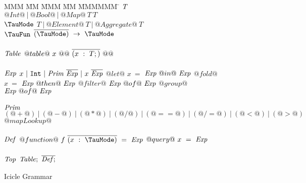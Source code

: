 
\begin{figure}

\begin{tabbing}
MMM \= MM \= MMM \= MM \= MMMMMM \= \kill
$\mathit{T}$
\GrammarDef
  $@Int@~|~@Bool@~|~@Map@~T~T$
\\
$\mi{\TauMode}$
\GrammarDef
  $T~|~@Element@~T~|~@Aggregate@~T$
\\
$\mi{\TauFun}$
\GrammarDef
  $\ov{(\TauMode)}~\to~\TauMode$
\\
\\

$\mathit{Table}$
\GrammarDef
  $@table@~x~@{@~\overline{(x~:~T;)}~@}@$
\\
\\

$\mathit{Exp}$
\GrammarDef
  $x~|~\mathtt{Int}~|~\mathit{Prim}~\overline{\mathit{Exp}}~|~x~\overline{\mathit{Exp}}$
\GrammarAlt
  $@let@$   \> $x~=$ \> $\mathit{Exp}~@  in@~\mathit{Exp}$
\GrammarAlt
  $@fold@$  \> $x~=$ \> $\mathit{Exp}~@then@~\mathit{Exp}$
\GrammarAlt
  $@filter@$\> \> $\mathit{Exp}~@  of@~\mathit{Exp}$
\GrammarAlt
  $@group@$ \> \> $\mathit{Exp}~@  of@~\mathit{Exp}$
\\
\\

$\mathit{Prim}$
\GrammarDef
  $(@+@)~|~(@-@)~|~(@*@)~|~(@/@)~|~(@==@)~|~(@/=@)~|~(@<@)~|~(@>@)$
\GrammarAlt
  $@mapLookup@$
\\
\\


$\mathit{Def}$
\GrammarDef
  $@function@~f~\ov{(x~:~\TauMode)}~=~\mi{Exp}$
\GrammarAlt
  $@query@~x~=~\mathit{Exp}$
\\
\\
$\mathit{Top}$
\GrammarDef
  $\mathit{Table};~\overline{\mathit{Def};}$
\end{tabbing}

\caption{Icicle Grammar}
\label{fig:source:grammar}
\end{figure}

